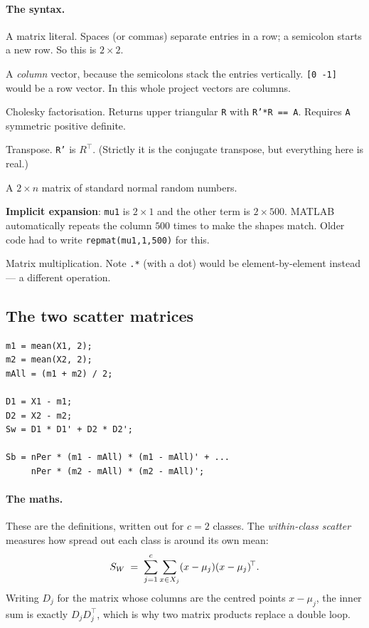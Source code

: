 \paragraph{The syntax.}
\begin{description}[leftmargin=*,style=nextline,nosep]
\item[\texttt{[16 0; 0 0.25]}] A matrix literal. Spaces (or commas) separate
  entries in a row; a semicolon starts a new row. So this is $2\times2$.
\item[\texttt{[0; -1]}] A \emph{column} vector, because the semicolons stack
  the entries vertically. \texttt{[0 -1]} would be a row vector. In this whole
  project vectors are columns.
\item[\texttt{chol(A)}] Cholesky factorisation. Returns upper triangular
  \texttt{R} with \texttt{R'*R == A}. Requires \texttt{A} symmetric positive
  definite.
\item[\texttt{'} (apostrophe)] Transpose. \texttt{R'} is $R^{\!\top}$. (Strictly
  it is the conjugate transpose, but everything here is real.)
\item[\texttt{randn(2,n)}] A $2\times n$ matrix of standard normal random
  numbers.
\item[\texttt{mu1 + R'*randn(2,nPer)}] \textbf{Implicit expansion}: \texttt{mu1}
  is $2\times1$ and the other term is $2\times500$. MATLAB automatically
  repeats the column $500$ times to make the shapes match. Older code had to
  write \texttt{repmat(mu1,1,500)} for this.
\item[\texttt{*}] Matrix multiplication. Note \texttt{.*} (with a dot) would be
  element-by-element instead --- a different operation.
\end{description}

\subsection{The two scatter matrices}

\begin{lstlisting}
m1 = mean(X1, 2);
m2 = mean(X2, 2);
mAll = (m1 + m2) / 2;

D1 = X1 - m1;
D2 = X2 - m2;
Sw = D1 * D1' + D2 * D2';

Sb = nPer * (m1 - mAll) * (m1 - mAll)' + ...
     nPer * (m2 - mAll) * (m2 - mAll)';
\end{lstlisting}

\paragraph{The maths.} These are the definitions, written out for $c=2$
classes. The \emph{within-class scatter} measures how spread out each class is
around its own mean:
\[
  S_W \;=\; \sum_{j=1}^{c} \sum_{x \in X_j} (x - \mu_j)(x - \mu_j)^{\!\top}.
\]
Writing $D_j$ for the matrix whose columns are the centred points
$x - \mu_j$, the inner sum is exactly $D_jD_j^{\!\top}$, which is why two
matrix products replace a double loop.

